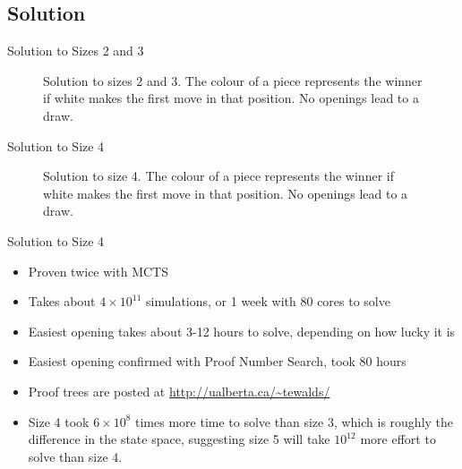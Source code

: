 \documentclass{beamer} %
\begin{document}
\subsection{Solution}

\begin{frame}{Solution to Sizes 2 and 3}
\begin{figure}[tb]
\centering

	\begin{HavannahBoard}[board size=2,coordinate style=classical,show coordinates=false]
	\end{HavannahBoard}

	\begin{HavannahBoard}[board size=3,coordinate style=classical,show coordinates=false]
	\end{HavannahBoard}
\caption{Solution to sizes 2 and 3. The colour of a piece represents the winner if white makes the first move in that position. No openings lead to a draw.}
\end{figure}
\end{frame}


\begin{frame}{Solution to Size 4}
\begin{figure}[tb]
\centering
	\begin{HavannahBoard}[board size=4,coordinate style=classical,show coordinates=false]
	\end{HavannahBoard}
\caption{Solution to size 4. The colour of a piece represents the winner if white makes the first move in that position. No openings lead to a draw.}
\end{figure}
\end{frame}

\begin{frame}{Solution to Size 4}
\begin{itemize}
\item Proven twice with MCTS
\item Takes about $4 \times 10^{11}$ simulations, or 1 week with 80 cores to solve
\item Easiest opening takes about 3-12 hours to solve, depending on how lucky it is
\item Easiest opening confirmed with Proof Number Search, took 80 hours
\item Proof trees are posted at \url{http://ualberta.ca/~tewalds/}
\item Size 4 took $6 \times 10^8$ times more time to solve than size 3, which is roughly the difference in the state space, suggesting size 5 will take $10^{12}$ more effort to solve than size 4.
\end{itemize}
\end{frame}
\end{document}
